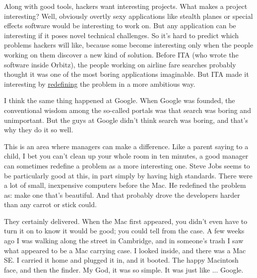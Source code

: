 Along with good tools, hackers want interesting
                    projects. What makes a project interesting? Well, obviously
                    overtly sexy applications like stealth planes or special
                    effects software would be interesting to work on. But any
                    application can be interesting if it poses novel technical
                    challenges. So it's hard to predict which problems hackers
                    will like, because some become interesting only when the
                    people working on them discover a new kind of solution.
                    Before ITA (who wrote the software inside Orbitz), the
                    people working on airline fare searches probably thought it
                    was one of the most boring applications imaginable. But ITA
                    made it interesting by
                    \href{http://www.paulgraham.com/carl.html}{redefining} the problem in a more
                    ambitious way.

I think the same thing happened at
                    Google. When Google was founded, the conventional wisdom
                    among the so-called portals was that search was boring and
                    unimportant. But the guys at Google didn't think search was
                    boring, and that's why they do it so well.

This
                    is an area where managers can make a difference. Like a
                    parent saying to a child, I bet you can't clean up your
                    whole room in ten minutes, a good manager can sometimes
                    redefine a problem as a more interesting one. Steve Jobs
                    seems to be particularly good at this, in part simply by
                    having high standards. There were a lot of small,
                    inexpensive computers before the Mac. He redefined the
                    problem as: make one that's beautiful. And that probably
                    drove the developers harder than any carrot or stick
                    could.

They certainly delivered. When the Mac
                    first appeared, you didn't even have to turn it on to know
                    it would be good; you could tell from the case. A few weeks
                    ago I was walking along the street in Cambridge, and in
                    someone's trash I saw what appeared to be a Mac carrying
                    case. I looked inside, and there was a Mac SE. I carried it
                    home and plugged it in, and it booted. The happy Macintosh
                    face, and then the finder. My God, it was so simple. It was
                    just like ... Google.

